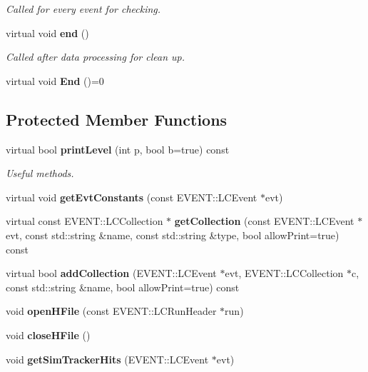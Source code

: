 \begin{DoxyCompactItemize}
\begin{DoxyCompactList}\small\item\em Called for every event for checking. \end{DoxyCompactList}\item 
virtual void {\bf end} ()\label{classTBTrackBaseProcessor_aafbf0e1c1af756ea03748e482883d763}

\begin{DoxyCompactList}\small\item\em Called after data processing for clean up. \end{DoxyCompactList}\item 
virtual void {\bfseries End} ()=0\label{classTBTrackBaseProcessor_a5103e722aff198e1a86efb76ffb753ae}

\end{DoxyCompactItemize}
\subsection*{Protected Member Functions}
\begin{DoxyCompactItemize}
\item 
virtual bool {\bf print\-Level} (int p, bool b=true) const \label{classTBTrackBaseProcessor_ad49019aae6d63f24ddac47796645beb4}

\begin{DoxyCompactList}\small\item\em Useful methods. \end{DoxyCompactList}\item 
virtual void {\bfseries get\-Evt\-Constants} (const E\-V\-E\-N\-T\-::\-L\-C\-Event $\ast$evt)\label{classTBTrackBaseProcessor_ac544e195fbe62f8113a4bd654ba1baf9}

\item 
virtual const E\-V\-E\-N\-T\-::\-L\-C\-Collection $\ast$ {\bfseries get\-Collection} (const E\-V\-E\-N\-T\-::\-L\-C\-Event $\ast$evt, const std\-::string \&name, const std\-::string \&type, bool allow\-Print=true) const \label{classTBTrackBaseProcessor_aa80ac72f17072d352c22cb3cb4f388ff}

\item 
virtual bool {\bfseries add\-Collection} (E\-V\-E\-N\-T\-::\-L\-C\-Event $\ast$evt, E\-V\-E\-N\-T\-::\-L\-C\-Collection $\ast$c, const std\-::string \&name, bool allow\-Print=true) const \label{classTBTrackBaseProcessor_a8c506fe8b1a3854dc18729e8c3253f16}

\item 
void {\bfseries open\-H\-File} (const E\-V\-E\-N\-T\-::\-L\-C\-Run\-Header $\ast$run)\label{classTBTrackBaseProcessor_ae88273f99fda5f6a3bcf94b16bcf96c9}

\item 
void {\bfseries close\-H\-File} ()\label{classTBTrackBaseProcessor_a258362bb0b7dd5126d069cc0bfcda956}

\item 
void {\bfseries get\-Sim\-Tracker\-Hits} (E\-V\-E\-N\-T\-::\-L\-C\-Event $\ast$evt)\label{classTBTrackBaseProcessor_aff9e06323f04642534a8522ea255497d}

\end{DoxyCompactItemize}
